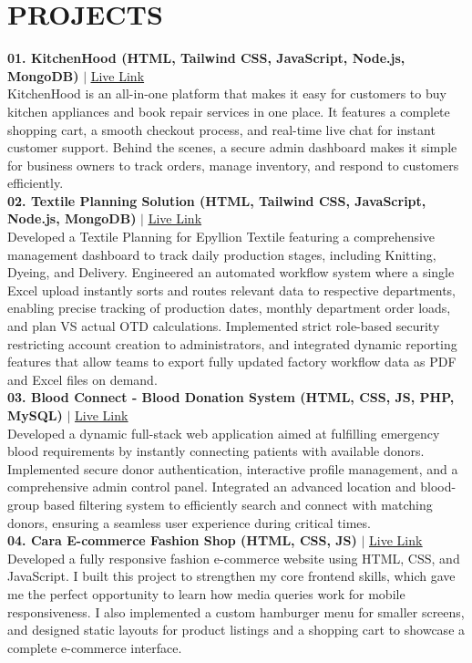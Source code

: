 \documentclass[11pt,a4paper]{article}
\begin{document}
\section*{PROJECTS}
\textbf{01. KitchenHood (HTML, Tailwind CSS, JavaScript, Node.js, MongoDB)} $|$ \href{https://kitchenhood-production.up.railway.app}{\uline{Live Link}}\\[0.2em]
KitchenHood is an all-in-one platform that makes it easy for customers to buy kitchen appliances and book repair
services in one place. It features a complete shopping cart, a smooth checkout process, and real-time live chat
for instant customer support. Behind the scenes, a secure admin dashboard makes it simple for business owners
to track orders, manage inventory, and respond to customers efficiently.\\[0.8em]
\textbf{02. Textile Planning Solution (HTML, Tailwind CSS, JavaScript, Node.js, MongoDB)} $|$ \href{https://epylion-project-v2.vercel.app/login.html}{\uline{Live Link}}\\[0.2em]
Developed a Textile Planning for Epyllion Textile featuring a comprehensive management dashboard to track daily production stages, including Knitting, Dyeing, and Delivery. Engineered an automated workflow system where a single Excel upload instantly sorts and routes relevant data to respective departments, enabling precise tracking of production dates, monthly department order loads, and plan VS actual OTD calculations. Implemented strict role-based security restricting account creation to administrators, and integrated dynamic reporting features that allow teams to export fully updated factory workflow data as PDF and Excel files on demand.\\[0.8em]
\textbf{03. Blood Connect - Blood Donation System (HTML, CSS, JS, PHP, MySQL)} $|$ \href{http://blood-connect.free.je/}{\uline{Live Link}}\\[0.2em]
Developed a dynamic full-stack web application aimed at fulfilling emergency blood requirements by instantly connecting patients with available donors. Implemented secure donor authentication, interactive profile management, and a comprehensive admin control panel. Integrated an advanced location and blood-group based filtering system to efficiently search and connect with matching donors, ensuring a seamless user experience during critical times.\\[0.8em]
\textbf{04. Cara E-commerce Fashion Shop (HTML, CSS, JS)} $|$ \href{https://cara-fashion-shop.netlify.app/}{\uline{Live Link}}\\[0.2em]
Developed a fully responsive fashion e-commerce website using HTML, CSS, and JavaScript. I built this project to strengthen my core frontend skills, which gave me the perfect opportunity to learn how media queries work for mobile responsiveness. I also implemented a custom hamburger menu for smaller screens, and designed static layouts for product listings and a shopping cart to showcase a complete e-commerce interface.
\end{document}
